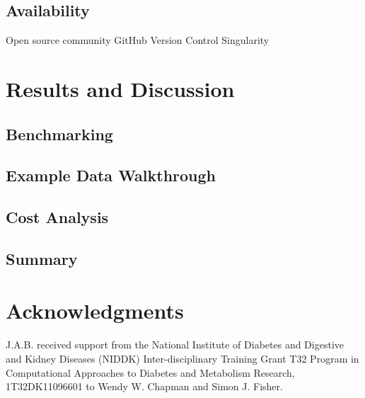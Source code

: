 \documentclass[11pt, a4paper, oneside]{article}
\begin{document}
\subsection{Availability}
Open source community
GitHub
Version Control
Singularity


\section*{Results and Discussion}

\subsection{Benchmarking}

\subsection{Example Data Walkthrough}

\subsection{Cost Analysis}

\subsection{Summary}







\section*{Acknowledgments}
J.A.B. received support from the National Institute of Diabetes and Digestive and Kidney Diseases (NIDDK) Inter-disciplinary Training Grant T32 Program in Computational Approaches to Diabetes and Metabolism Research, 1T32DK11096601 to Wendy W. Chapman and Simon J. Fisher.
\end{document}

